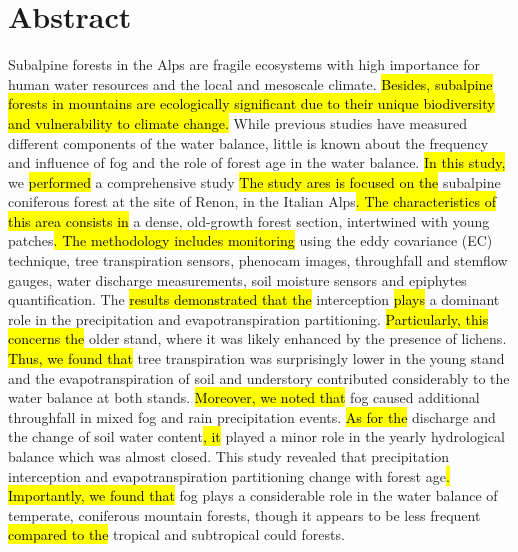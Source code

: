 \documentclass[10pt,letterpaper]{article}
\begin{document}
\section*{Abstract}
Subalpine forests in the Alps are fragile ecosystems with high importance for human water resources and the local and mesoscale climate. \hl{Besides, subalpine forests in mountains are ecologically significant due to their unique biodiversity and vulnerability to climate change. }While previous studies have measured different components of the water balance, little is known about the frequency and influence of fog and the role of forest age in the water balance. \hl{In this study, }we \hl{performed} a comprehensive study 
\hl{The study ares is focused on the }subalpine coniferous forest at the site of Renon, in the Italian Alps\hl{. The characteristics of this area consists in} a dense, old-growth forest section, intertwined with young patches\hl{. The methodology includes monitoring} using the eddy covariance (EC) technique, tree transpiration sensors, phenocam images, throughfall and stemflow gauges, water discharge measurements, soil moisture sensors and epiphytes quantification. The \hl{results demonstrated that the }interception \hl{plays} a dominant role in the precipitation and evapotranspiration partitioning. \hl{Particularly, this concerns the }older stand, where it was likely enhanced by the presence of lichens. \hl{Thus, we found that }tree transpiration was surprisingly lower in the young stand and the evapotranspiration of soil and understory contributed considerably to the water balance at both stands. \hl{Moreover, we noted that  }fog caused additional throughfall in mixed fog and rain precipitation events. \hl{As for the }discharge and the change of soil water content\hl{, it }played a minor role in the yearly hydrological balance which was almost closed. This study revealed that precipitation interception and evapotranspiration partitioning change with forest age\hl{. Importantly, we found that }fog plays a considerable role in the water balance of temperate, coniferous mountain forests, though it appears to be less frequent \hl{compared to the} tropical and subtropical could forests.

\end{document}
